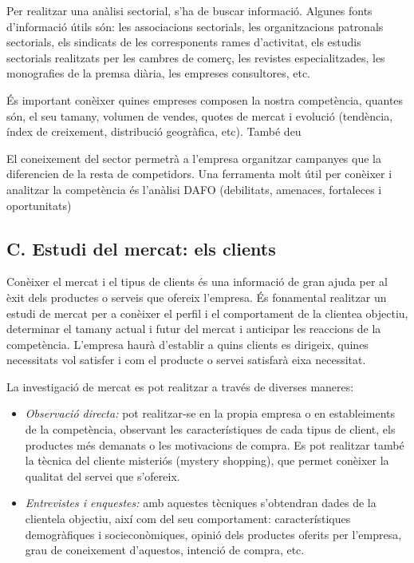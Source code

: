 \documentclass[
]{book}
\begin{document}
Per realitzar una anàlisi sectorial, s'ha de buscar informació. Algunes fonts d'informació útils són: les associacions sectorials, les organitzacions patronals sectorials, els sindicats de les corresponents rames d'activitat, els estudis sectorials realitzats per les cambres de comerç, les revistes especialitzades, les monografies de la premsa diària, les empreses consultores, etc.

És important conèixer quines empreses composen la nostra competència, quantes són, el seu tamany, volumen de vendes, quotes de mercat i evolució (tendència, índex de creixement, distribució geogràfica, etc). També deu

El coneixement del sector permetrà a l'empresa organitzar campanyes que la diferencien de la resta de competidors. Una ferramenta molt útil per conèixer i analitzar la competència és l'anàlisi DAFO (debilitats, amenaces, fortaleces i oportunitats)

\hypertarget{c.-estudi-del-mercat-els-clients}{%
\subsection*{C. Estudi del mercat: els clients}\label{c.-estudi-del-mercat-els-clients}}

Conèixer el mercat i el tipus de clients és una informació de gran ajuda per al èxit dels productes o serveis que ofereix l'empresa. És fonamental realitzar un estudi de mercat per a conèixer el perfil i el comportament de la clientea objectiu, determinar el tamany actual i futur del mercat i anticipar les reaccions de la competència. L'empresa haurà d'establir a quins clients es dirigeix, quines necessitats vol satisfer i com el producte o servei satisfarà eixa necessitat.

La investigació de mercat es pot realitzar a través de diverses maneres:

\begin{itemize}
\item
  \emph{Observació directa:} pot realitzar-se en la propia empresa o en estableiments de la competència, observant les característiques de cada tipus de client, els productes més demanats o les motivacions de compra. Es pot realitzar també la tècnica del cliente misteriós (mystery shopping), que permet conèixer la qualitat del servei que s'ofereix.
\item
  \emph{Entrevistes i enquestes:} amb aquestes tècniques s'obtendran dades de la clientela objectiu, així com del seu comportament: característiques demogràfiques i socieconòmiques, opinió dels productes oferits per l'empresa, grau de coneixement d'aquestos, intenció de compra, etc.
\end{itemize}
\end{document}
